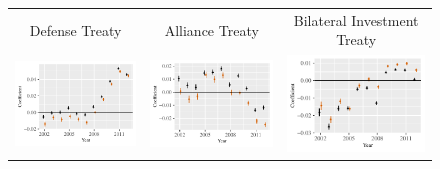\documentclass[reqno,onecolumn,letterpaper,12pt]{article}
\begin{document}
\begin{figure}[htp]
\begin{tabular}{@{\hskip -.05cm}c@{\hskip -.2cm}c@{\hskip -.2cm}c}
Defense Treaty &
Alliance Treaty &
Bilateral Investment Treaty \\

\includegraphics[height=.165\textheight, clip=true, trim=.5cm .5cm 0cm .1cm]{figures/main_rl_plots/Defense_Treaty.pdf}   &
\includegraphics[height=.165\textheight, clip=true, trim=.5cm .5cm 0cm .1cm]{figures/main_rl_plots/Non_Defense_Treaty.pdf} &
\includegraphics[height=.165\textheight, clip=true, trim=.5cm .5cm 0cm .1cm]{figures/main_rl_plots/Bilateral_Investment_Treaty.pdf}    \\




\end{tabular}
\end{figure}
\end{document}
